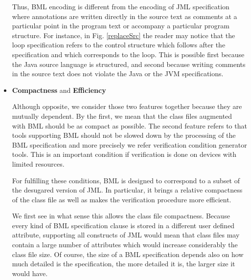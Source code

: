 \documentclass[a4paper]{llncs}
\begin{document}
\begin{itemize}

	    Thus, BML encoding is different from the encoding of JML
	    specification where annotations are written directly in
	    the source text as comments at a particular point in the
	    program text or accompany a particular program
	    structure. For instance, in Fig. \ref{replaceSrc} the
	    reader may notice that the loop specification refers to
	    the control structure which follows after the
	    specification and which corresponds to the loop.  This is
	    possible first because the Java source language is
	    structured, and second because writing comments in the
	    source text does not violate the Java or the JVM
	    specifications.
	  


\item \textbf{Compactness} and \textbf{Efficiency}

      Although opposite, we consider those two features together
      because they are mutually dependent. By the first, we mean that
      the class files augmented with BML should be as compact as
      possible.  The second feature refers to that tools supporting
      BML should not be slowed down by the processing of the BML
      specification and more precisely we refer verification condition
      generator tools.  This is an important condition if verification
      is done on devices with limited resources.

      For fulfilling these conditions, BML is designed to correspond
      to a subset of the desugared version of JML.  In particular, it
      brings a relative compactness of the class file as well as makes
      the verification procedure more efficient.


      We first see in what sense this allows the class file
      compactness. Because every kind of BML specification clause is
      stored in a different user defined attribute, supporting all
      constructs of JML would mean that class files may contain a
      large number of attributes which would increase considerably the
      class file size. Of course, the size of a BML specification
      depends also on how much detailed is the specification, the more
      detailed it is, the larger size it would have.
      

\end{itemize}
\end{document}
